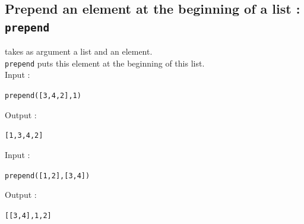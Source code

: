 \documentclass[a4paper,11pt]{book}
\begin{document}
\subsection{Prepend an element at the beginning of a list : {\tt prepend}}
 takes as argument a list and an element.\\
{\tt prepend} puts this element at the beginning of this list.\\
Input :
\begin{center}{\tt prepend([3,4,2],1)}\end{center}
Output :
\begin{center}{\tt  [1,3,4,2]}\end{center}
Input :
\begin{center}{\tt prepend([1,2],[3,4])}\end{center}
Output :
\begin{center}{\tt [[3,4],1,2]}\end{center}
\end{document}
